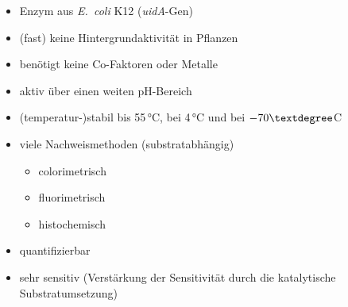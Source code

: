 
\begin{itemize}
    \item Enzym aus \textit{E.~coli} K12 (\textit{uidA}-Gen)
    \item (fast) keine Hintergrundaktivität in Pflanzen
    \item benötigt keine Co-Faktoren oder Metalle
    \item aktiv über einen weiten pH-Bereich
    \item (temperatur-)stabil bis 55\,°C, bei 4\,°C und bei $-70\textdegree$C
    \item viele Nachweismethoden (substratabhängig)
    \begin{itemize}
        \item colorimetrisch
        \item fluorimetrisch
        \item histochemisch
    \end{itemize}
    \item quantifizierbar
    \item sehr sensitiv (Verstärkung der Sensitivität durch die katalytische Substratumsetzung)
\end{itemize}


